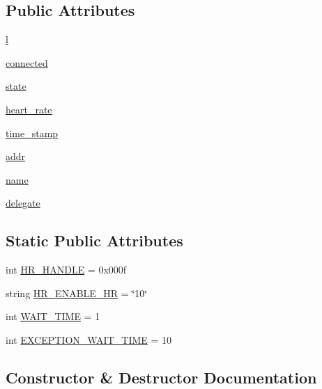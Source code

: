 \subsection*{Public Attributes}
\begin{DoxyCompactItemize}
\item 
\hyperlink{classble__hr_1_1ble__hr_a82fd3d4aeb109601084a6e18b9edcae1}{l}
\item 
\hyperlink{classble__hr_1_1ble__hr_a16c7c73e0e680ed4e75d2bb3ce3c8be6}{connected}
\item 
\hyperlink{classble__hr_1_1ble__hr_af6078f5d64042eb96472a6cd58c628c7}{state}
\item 
\hyperlink{classble__hr_1_1ble__hr_ad10bbee4f4ec4c0b14bb18cd41f16f5a}{heart\+\_\+rate}
\item 
\hyperlink{classble__hr_1_1ble__hr_a84c65caf99b9c4581310c20440a2f79d}{time\+\_\+stamp}
\item 
\hyperlink{classble__hr_1_1ble__hr_a57de0d26c0ef685006b704485bc80902}{addr}
\item 
\hyperlink{classble__hr_1_1ble__hr_ad066520110396ab007fdede6fa964f09}{name}
\item 
\hyperlink{classble__hr_1_1ble__hr_af7f3d4a78f3f741ca4228e51bb99bc19}{delegate}
\end{DoxyCompactItemize}
\subsection*{Static Public Attributes}
\begin{DoxyCompactItemize}
\item 
int \hyperlink{classble__hr_1_1ble__hr_a574a704352ba524a64a2848b007fea0e}{H\+R\+\_\+\+H\+A\+N\+D\+LE} = 0x000f
\item 
string \hyperlink{classble__hr_1_1ble__hr_a0c7c049dc28ba565716bad3f7c39440b}{H\+R\+\_\+\+E\+N\+A\+B\+L\+E\+\_\+\+HR} = \char`\"{}10\char`\"{}
\item 
int \hyperlink{classble__hr_1_1ble__hr_ac59cab95f8364859fc1de4eb30662e27}{W\+A\+I\+T\+\_\+\+T\+I\+ME} = 1
\item 
int \hyperlink{classble__hr_1_1ble__hr_a04d3ee726f59e2de0318d6f2701def7f}{E\+X\+C\+E\+P\+T\+I\+O\+N\+\_\+\+W\+A\+I\+T\+\_\+\+T\+I\+ME} = 10
\end{DoxyCompactItemize}


\subsection{Constructor \& Destructor Documentation}
\mbox{\label{classble__hr_1_1ble__hr_af31908249a7579dbdd49df718a789dde}} 
